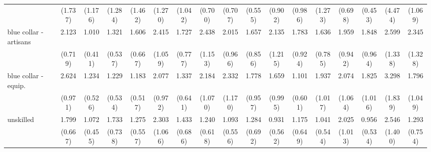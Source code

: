 {\begin{tabular}{l*{16}{c}}
                    &     (1.737)         &     (1.176)         &     (1.284)         &     (1.462)         &     (1.270)         &     (1.042)         &     (0.700)         &     (0.707)         &     (0.555)         &     (0.902)         &     (0.986)         &     (1.273)         &     (0.698)         &     (0.453)         &     (4.474)         &     (1.069)         \\
[1em]
blue collar - artisans&       2.123\sym{*}  &       1.010         &       1.321         &       1.606         &       2.415\sym{*}  &       1.727         &       2.438         &       2.015         &       1.657         &       2.135         &       1.783         &       1.636         &       1.959         &       1.848         &       2.599         &       2.345         \\
                    &     (0.719)         &     (0.411)         &     (0.537)         &     (0.667)         &     (1.059)         &     (0.777)         &     (1.153)         &     (0.966)         &     (0.856)         &     (1.215)         &     (0.924)         &     (0.785)         &     (0.942)         &     (0.964)         &     (1.338)         &     (1.328)         \\
[1em]
blue collar - equip.&       2.624\sym{**} &       1.234         &       1.229         &       1.183         &       2.077         &       1.337         &       2.184         &       2.332         &       1.778         &       1.659         &       1.101         &       1.937         &       2.074         &       1.825         &       3.298\sym{*}  &       1.796         \\
                    &     (0.971)         &     (0.526)         &     (0.534)         &     (0.517)         &     (0.972)         &     (0.641)         &     (1.070)         &     (1.170)         &     (0.957)         &     (0.995)         &     (0.601)         &     (1.017)         &     (1.064)         &     (1.016)         &     (1.839)         &     (1.049)         \\
[1em]
unskilled           &       1.799         &       1.072         &       1.733         &       1.275         &       2.303         &       1.433         &       1.240         &       1.093         &       1.284         &       0.931         &       1.175         &       1.041         &       2.025         &       0.956         &       2.546         &       1.293         \\
                    &     (0.667)         &     (0.455)         &     (0.738)         &     (0.557)         &     (1.066)         &     (0.686)         &     (0.618)         &     (0.556)         &     (0.692)         &     (0.562)         &     (0.649)         &     (0.544)         &     (1.013)         &     (0.534)         &     (1.400)         &     (0.754)         \\

\end{tabular}}
